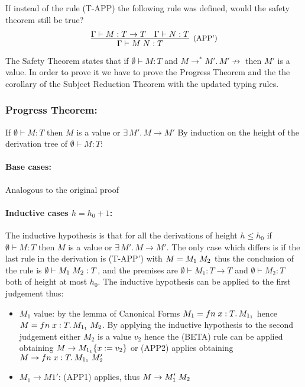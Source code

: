 \subsection{}

If instead of the rule (T-APP) the following rule was defined, would the safety
theorem still be true?
\[
	\infer[\text{\small{(APP')}}]
	{\Gamma \vdash \APP{M}{N}: T}
	{
		\Gamma \vdash M: T \to T &
		\Gamma \vdash N: T
	}
\]

The Safety Theorem states that if $\emptyset \vdash M: T$ and $M \to^\ast M'.\, M' \not\to$ then
$M'$  is a value.
In order to prove it we have to prove the Progress Theorem and the the corollary of the
Subject Reduction Theorem with the updated typing rules.

\subsubsection*{Progress Theorem:}

If $\emptyset \vdash M: T$ then $M$ is a value or $\exists\, M'.\, M \to M'$
By induction on the height of the derivation tree of $\emptyset \vdash M: T$:

\paragraph*{Base cases:\\}
Analogous to the original proof

\paragraph*{Inductive cases $h = h_0 + 1$:\\}

The inductive hypothesis is that for all the derivations of height $h \le h_0$ if
$\emptyset \vdash M: T$ then $M$ is a value or $\exists\, M'.\, M \to M'$. The only case which
differs is if the last rule in the derivation is (T-APP') with $M = M_1\;M_2$ thus the
conclusion of the rule is $\emptyset \vdash M_1\;M_2: T$, and the premises are
$\emptyset \vdash M_1 : T \to T$ and $\emptyset \vdash M_2: T$ both of height at most $h_0$.
The inductive hypothesis can be applied to the first judgement thus:
\begin{itemize}
	\item $M_1$ value: by the lemma of Canonical Forms $M_1 = fn\;x:T.\,M_{1_1}$ hence
	      $M = fn\;x:T.\,M_{1_1}\;M_2$. By applying the inductive hypothesis to the second
	      judgement either $M_2$ is a value $v_2$ hence the (BETA) rule can be applied obtaining
	      $M \to M_{1_1}\{x:=v_2\}$ or (APP2) applies obtaining
	      $M \to fn\;x:T.\,M_{1_1}\;M_2'$
	\item $M_1 \to M1'$: (APP1) applies, thus $M \to M_1'\;M_2$
\end{itemize}

